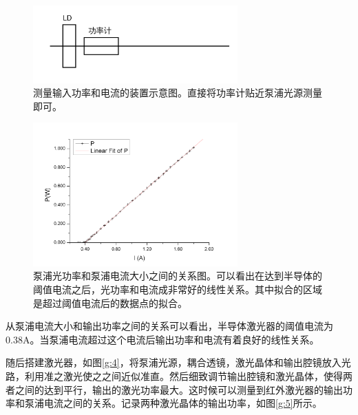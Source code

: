 \documentclass[aps,pre,12pt,preprint,onecolumn,showpacs,showkeys,UTF8]{revtex4-1}
\begin{document}
\begin{figure}[h]
	\begin{center}
		\includegraphics[width=0.7\textwidth]{pic2.png}
		\caption{\label{g:2}测量输入功率和电流的装置示意图。直接将功率计贴近泵浦光源测量即可。}
	\end{center}
\end{figure}
\begin{figure}[h]
	\begin{center}
		\includegraphics[width=0.7\textwidth]{pic3.png}
		\caption{\label{g:3}泵浦光功率和泵浦电流大小之间的关系图。可以看出在达到半导体的阈值电流之后，光功率和电流成非常好的线性关系。其中拟合的区域是超过阈值电流后的数据点的拟合。}
	\end{center}
\end{figure}

从泵浦电流大小和输出功率之间的关系可以看出，半导体激光器的阈值电流为0.38A。当泵浦电流超过这个电流后输出功率和电流有着良好的线性关系。

随后搭建激光器，如图\ref{g:4}，将泵浦光源，耦合透镜，激光晶体和输出腔镜放入光路，利用准之激光使之之间近似准直。然后细致调节输出腔镜和激光晶体，使得两者之间的达到平行，输出的激光功率最大。这时候可以测量到红外激光器的输出功率和泵浦电流之间的关系。记录两种激光晶体的输出功率，如图\ref{g:5}所示。
\end{document}

